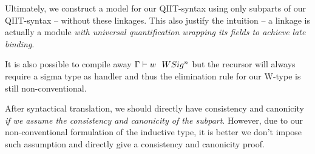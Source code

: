 Ultimately, we construct a model for our QIIT-syntax using only subparts of our QIIT-syntax -- without these linkages. This also justify the intuition -- a linkage is actually a module \textit{with universal quantification wrapping its fields to achieve late binding}. 

It is also possible to compile away ${ {\Gamma} \vdash {w} \ \ WSig^{n} }$ but the recursor will always require a sigma type as handler and thus the elimination rule for our W-type is still non-conventional.

After syntactical translation, we should directly have consistency and canonicity \textit{if we assume the consistency and canonicity of the subpart}. However, due to our non-conventional formulation of the inductive type, it is better we don't impose such assumption and directly give a consistency and canonicity proof.
